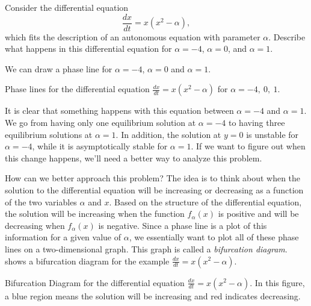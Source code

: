 \documentclass{ximera}
\begin{document}
\begin{example}
    Consider the differential equation
    \begin{equation*}
        \frac{dx}{dt} = x(x^2 - \alpha),
    \end{equation*}
    which fits the description of an autonomous equation with parameter $\alpha$. Describe what happens in this differential equation for $\alpha = -4$, $\alpha = 0$, and $\alpha = 1$. 
\end{example}
\begin{exampleSol}
    We can draw a phase line for $\alpha = -4$, $\alpha = 0$ and $\alpha = 1$. 
    \begin{myfig}
        \capstart
        \caption{Phase lines for the differential equation $\frac{dx}{dt} = x(x^2 - \alpha)$ for $\alpha = -4,\ 0,\ 1$. \label{autobif_plplot:fig}}
    \end{myfig}
    It is clear that something happens with this equation between $\alpha = -4$ and $\alpha = 1$. We go from having only one equilibrium solution at $\alpha = -4$ to having three equilibrium solutions at $\alpha = 1$. In addition, the solution at $y=0$ is unstable for $\alpha = -4$, while it is asymptotically stable for $\alpha = 1$. If we want to figure out when this change happens, we'll need a better way to analyze this problem.
\end{exampleSol}

How can we better approach this problem? The idea is to think about when the solution to the differential equation will be increasing or decreasing as a function of the two variables $\alpha$ and $x$. Based on the structure of the differential equation, the solution will be increasing when the function $f_\alpha(x)$ is positive and will be decreasing when $f_\alpha(x)$ is negative. Since a phase line is a plot of this information for a given value of $\alpha$, we essentially want to plot all of these phase lines on a two-dimensional graph. This graph is called a \emph{bifurcation diagram}.  shows a bifurcation diagram for the example $\frac{dx}{dt} = x(x^2-\alpha)$.
\begin{myfig}
    \capstart
    \caption{Bifurcation Diagram for the differential equation $\frac{dx}{dt} = x(x^2 - \alpha)$. In this figure, a blue region means the solution will be increasing and red indicates decreasing. \label{bifdiag_ex1:fig}}
\end{myfig}
\end{document}
